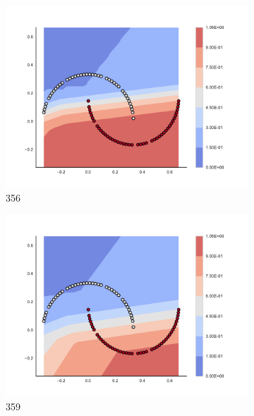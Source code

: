 \begin{figure}[h]
\begin{subfigure}[b]{0.09\textwidth}
    \includegraphics[clip, trim=2.35cm 1.75cm 4.5cm 0cm,width=\textwidth]{img/convergence/356.pdf}
    \caption{356}
    \label{fig:convergence_356}
\end{subfigure}
%
\begin{subfigure}[b]{0.09\textwidth}
    \includegraphics[clip, trim=2.35cm 1.75cm 4.5cm 0cm,width=\textwidth]{img/convergence/359.pdf}
    \caption{359}
    \label{fig:convergence_359}
\end{subfigure}
%
\begin{subfigure}[b]{0.09\textwidth}

\end{subfigure}
\end{figure}
